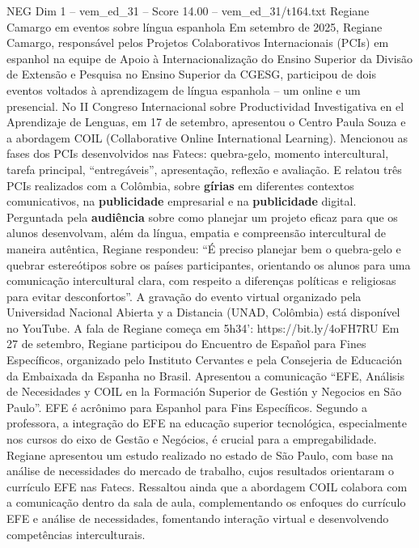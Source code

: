 \begin{textsample}{NEG Dim 1 – vem\_ed\_31 – Score 14.00 – vem\_ed\_31/t164.txt}  \label{ex:f1_neg_149}
Regiane Camargo em eventos sobre língua espanhola Em setembro de 2025, Regiane Camargo, responsável pelos Projetos Colaborativos Internacionais (PCIs) em espanhol na equipe de Apoio à Internacionalização do Ensino Superior da Divisão de Extensão e Pesquisa no Ensino Superior da CGESG, participou de dois eventos voltados à aprendizagem de língua espanhola – um online e um presencial.
No II Congreso Internacional sobre Productividad Investigativa en el Aprendizaje de Lenguas, em 17 de setembro, apresentou o Centro Paula Souza e a abordagem COIL (Collaborative Online International Learning).
Mencionou as fases dos PCIs desenvolvidos nas Fatecs: quebra-gelo, momento intercultural, tarefa principal, “entregáveis”, apresentação, reflexão e avaliação.
E relatou três PCIs realizados com a Colômbia, sobre \textbf{gírias} em diferentes contextos comunicativos, na \textbf{publicidade} empresarial e na \textbf{publicidade} digital.
Perguntada pela \textbf{audiência} sobre como planejar um projeto eficaz para que os alunos desenvolvam, além da língua, empatia e compreensão intercultural de maneira autêntica, Regiane respondeu: “É preciso planejar bem o quebra-gelo e quebrar estereótipos sobre os países participantes, orientando os alunos para uma comunicação intercultural clara, com respeito a diferenças políticas e religiosas para evitar desconfortos”.
A gravação do evento virtual organizado pela Universidad Nacional Abierta y a Distancia (UNAD, Colômbia) está disponível no YouTube.
A fala de Regiane começa em 5h34’: https://bit.ly/4oFH7RU Em 27 de setembro, Regiane participou do Encuentro de Español para Fines Específicos, organizado pelo Instituto Cervantes e pela Consejeria de Educación da Embaixada da Espanha no Brasil.
Apresentou a comunicação “EFE, Análisis de Necesidades y COIL en la Formación Superior de Gestión y Negocios en São Paulo”.
EFE é acrônimo para Espanhol para Fins Específicos.
Segundo a professora, a integração do EFE na educação superior tecnológica, especialmente nos cursos do eixo de Gestão e Negócios, é crucial para a empregabilidade.
Regiane apresentou um estudo realizado no estado de São Paulo, com base na análise de necessidades do mercado de trabalho, cujos resultados orientaram o currículo EFE nas Fatecs.
Ressaltou ainda que a abordagem COIL colabora com a comunicação dentro da sala de aula, complementando os enfoques do currículo EFE e análise de necessidades, fomentando interação virtual e desenvolvendo competências interculturais.

\end{textsample}
